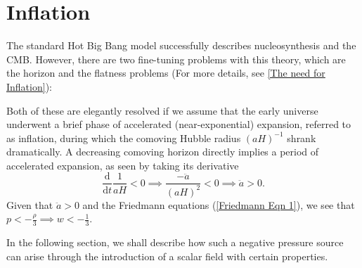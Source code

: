 \documentclass[aps,prd,reprint,preprintnumbers,showpacs,floatfix,nofootinbib,superscript address]{revtex4-2}
\newcommand{\wb}[1]{{\color[RGB]{255,0,0}{\textbf{\textit{[WB: #1]}}}}}
\begin{document}
\section{Inflation}\label{Inflation}
The standard Hot Big Bang model successfully describes nucleosynthesis and the CMB. However, there are two fine-tuning problems with this theory, which are the horizon and the flatness problems (For more details, see \cref{The need for Inflation}): 

Both of these are elegantly resolved if we assume that the early universe underwent a brief phase of accelerated (near-exponential) expansion, referred to as inflation, during which the comoving Hubble radius $(aH)^{-1}$ shrank dramatically. A decreasing comoving horizon directly implies a period of accelerated expansion, as seen by taking its derivative
\begin{equation}
    \frac{\mathrm{d}}{\mathrm{d}t} \frac{1}{aH} <  0 \implies \frac{-\ddot{a}}{(aH)^2} < 0 \implies \ddot{a} > 0.
\end{equation}
Given that $\ddot{a} > 0$ and the Friedmann equations (\cref{Friedmann Eqn 1}), we see that $p < -\frac{\rho}{3} \implies w < - \frac{1}{3}$. 

In the following section, we shall describe how such a negative pressure source can arise through the introduction of a scalar field with certain properties.
\end{document}
